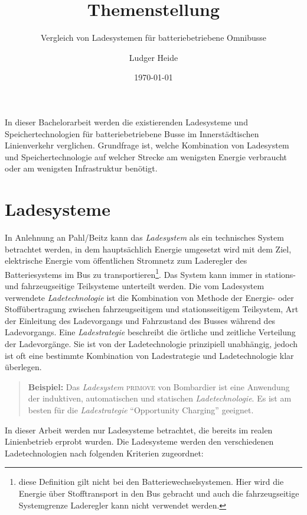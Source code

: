 \documentclass{scrreprt}
\title{Themenstellung}
\subtitle{Vergleich von Ladesystemen für batteriebetriebene Omnibusse}
\date{\today}
\author{Ludger Heide}
\begin{document}

\maketitle



In dieser Bachelorarbeit werden die existierenden Ladesysteme und Speichertechnologien für batteriebetriebene Busse im Innerstädtischen Linienverkehr verglichen. Grundfrage ist, welche Kombination von Ladesystem und Speichertechnologie auf welcher Strecke am wenigsten Energie verbraucht oder am wenigsten Infrastruktur benötigt.

\chapter{Ladesysteme}

In Anlehnung an Pahl/Beitz \cite[S. 258]{feldhusen2013pahl} kann das \emph{Ladesystem} als ein technisches System betrachtet werden, in dem hauptsächlich Energie umgesetzt wird mit dem Ziel, elektrische Energie vom öffentlichen Stromnetz zum Laderegler des Batteriesystems im Bus zu transportieren\footnote{diese Definition gilt nicht bei den Batteriewechselsystemen. Hier wird die Energie über Stofftransport in den Bus gebracht und auch die fahrzeugseitige Systemgrenze Laderegler kann nicht verwendet werden.}. Das System kann immer in stations- und fahrzeugseitige Teilsysteme unterteilt werden. Die vom Ladesystem verwendete \emph{Ladetechnologie} ist die Kombination von Methode der Energie- oder Stoffübertragung zwischen fahrzeugseitigem und stationsseitigem Teilsystem, Art der Einleitung des Ladevorgangs und Fahrzustand des Busses während des Ladevorgangs. Eine \emph{Ladestrategie} beschreibt die örtliche und zeitliche Verteilung der Ladevorgänge. Sie ist von der Ladetechnologie prinzipiell unabhängig, jedoch ist oft eine bestimmte Kombination von Ladestrategie und Ladetechnologie klar überlegen.

\begin{quote}
	\textbf{Beispiel:} Das \emph{Ladesystem} \textsc{primove} von Bombardier ist eine Anwendung der induktiven, automatischen und statischen \emph{Ladetechnologie}. Es ist am besten für die \emph{Ladestrategie} "`Opportunity Charging"' geeignet.
\end{quote}

In dieser Arbeit werden nur Ladesysteme betrachtet, die bereits im realen Linienbetrieb erprobt wurden. Die Ladesysteme werden den verschiedenen Ladetechnologien nach folgenden Kriterien zugeordnet:
\end{document}
